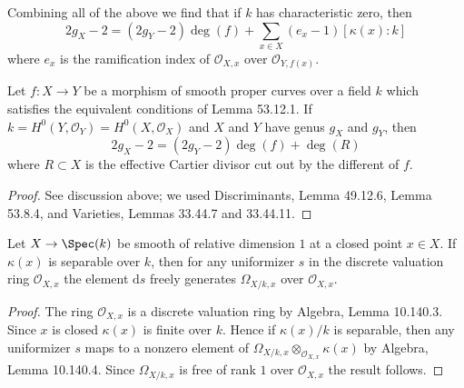 Combining all of the above we find that if $k$ has characteristic zero, then
\[2g_X-2=(2g_Y-2)\deg(f)+\sum_{x\in X}(e_x-1)[\kappa(x):k]\]
where $e_x$ is the ramification index of $\mathcal O_{X,x}$ over $\mathcal O_{Y,f(x)}$.

\begin{lemma}[53.12.2; Tag 0C1D]
Let $f:X\to Y$ be a morphism of smooth proper curves over a field $k$ which satisfies the equivalent conditions of Lemma 53.12.1. If $k=H^0(Y,\mathcal O_Y)=H^0(X,\mathcal O_X)$ and $X$ and $Y$ have genus $g_X$ and $g_Y$, then
\[2g_X-2=(2g_Y-2)\deg(f)+\deg(R)\]
where $R\subset X$ is the effective Cartier divisor cut out by the different of $f$.
\end{lemma}
\begin{proof}
See discussion above; we used Discriminants, Lemma 49.12.6, Lemma 53.8.4, and Varieties, Lemmas 33.44.7 and 33.44.11.
\end{proof}
\begin{lemma}[53.12.3; Tag 0C1E]
Let $X\to\Spec(k)$ be smooth of relative dimension $1$ at a closed point $x\in X$. If $\kappa(x)$ is separable over $k$, then for any uniformizer $s$ in the discrete valuation ring $\mathcal O_{X,x}$ the element $\mathrm ds$ freely generates $\Omega_{X/k,x}$ over $\mathcal O_{X,x}$.
\end{lemma}
\begin{proof}
The ring $\mathcal O_{X,x}$ is a discrete valuation ring by Algebra, Lemma 10.140.3. Since $x$ is closed $\kappa(x)$ is finite over $k$. Hence if $\kappa(x)/k$ is separable, then any uniformizer $s$ maps to a nonzero element of $\Omega_{X/k,x}\otimes_{\mathcal O_{X,x}}\kappa(x)$ by Algebra, Lemma 10.140.4. Since $\Omega_{X/k,x}$ is free of rank $1$ over $\mathcal O_{X,x}$ the result follows.
\end{proof}

